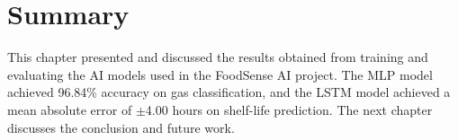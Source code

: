 \section{Summary}
This chapter presented and discussed the results obtained from training and evaluating the AI models used in the FoodSense AI project. The MLP model achieved 96.84\% accuracy on gas classification, and the LSTM model achieved a mean absolute error of $\pm$4.00 hours on shelf-life prediction. The next chapter discusses the conclusion and future work.
